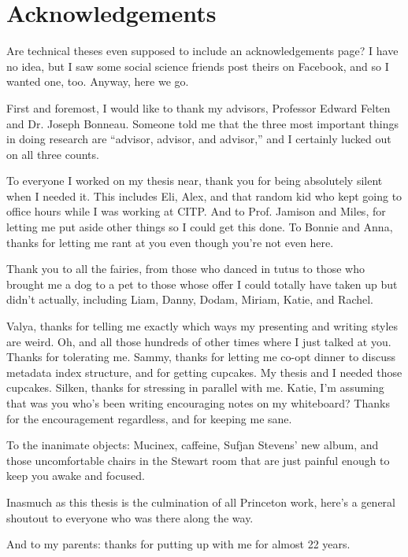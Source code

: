 \documentclass[pageno]{jpaper}
\begin{document}
\pagebreak

\section*{Acknowledgements}

Are technical theses even supposed to include an acknowledgements page? I have no idea, but I saw some social science friends post theirs on Facebook, and so I wanted one, too. Anyway, here we go.

First and foremost, I would like to thank my advisors, Professor Edward Felten and Dr. Joseph Bonneau. Someone told me that the three most important things in doing research are “advisor, advisor, and advisor,” and I certainly lucked out on all three counts.

To everyone I worked on my thesis near, thank you for being absolutely silent when I needed it. This includes Eli, Alex, and that random kid who kept going to office hours while I was working at CITP. And to Prof. Jamison and Miles, for letting me put aside other things so I could get this done. To Bonnie and Anna, thanks for letting me rant at you even though you’re not even here.

Thank you to all the fairies, from those who danced in tutus to those who brought me a dog to a pet to those whose offer I could totally have taken up but didn’t actually, including Liam, Danny, Dodam, Miriam, Katie, and Rachel.

Valya, thanks for telling me exactly which ways my presenting and writing styles are weird. Oh, and all those hundreds of other times where I just talked at you. Thanks for tolerating me. Sammy, thanks for letting me co-opt dinner to discuss metadata index structure, and for getting cupcakes. My thesis and I needed those cupcakes. Silken, thanks for stressing in parallel with me. Katie, I’m assuming that was you who’s been writing encouraging notes on my whiteboard? Thanks for the encouragement regardless, and for keeping me sane.

To the inanimate objects: Mucinex, caffeine, Sufjan Stevens’ new album, and those uncomfortable chairs in the Stewart room that are just painful enough to keep you awake and focused.

Inasmuch as this thesis is the culmination of all Princeton work, here’s a general shoutout to everyone who was there along the way.

And to my parents: thanks for putting up with me for almost 22 years.

\pagebreak



\end{document}
